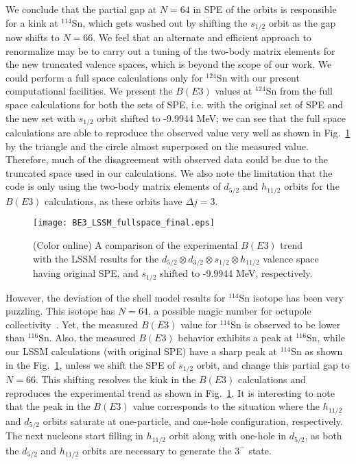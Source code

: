 \documentclass[twocolumn,showpacs,showkeys,preprintnumbers,amsmath,amssymb]{revtex4}
\begin{document}
We conclude that the partial gap at $N=64$ in SPE of the orbits is responsible for a kink at $^{114}$Sn, which gets washed out by shifting the $s_{1/2}$ orbit as the gap now shifts to $N=66$. We feel that an alternate and efficient approach to renormalize may be to carry out a tuning of the two-body matrix elements for the new truncated valence spaces, which is beyond the scope of our work. We could perform a full space calculations only for $^{124}$Sn with our present computational facilities. We present the $B(E3)$ values at $^{124}$Sn from the full space calculations for both the sets of SPE, i.e. with the original set of SPE and the new set with $s_{1/2}$ orbit shifted to -9.9944 MeV; we can see that the full space calculations are able to reproduce the observed value very well as shown in Fig.~\ref{fig:BE3_full} by the triangle and the circle almost superposed on the measured value. Therefore, much of the disagreement with observed data could be due to the truncated space used in our calculations. We also note the limitation that the code is only using the two-body matrix elements of $d_{5/2}$ and $h_{11/2}$ orbits for the $B(E3)$ calculations, as these orbits have $\Delta j=3$.

\begin{figure}
\texttt{[image: BE3\_LSSM\_fullspace\_final.eps]}
\caption{\label{fig:BE3_full}(Color online) A comparison of the experimental $B(E3)$ trend with the LSSM results for the $d_{5/2} \otimes d_{3/2} \otimes s_{1/2} \otimes h_{11/2}$ valence space having original SPE, and $s_{1/2}$ shifted to -9.9944 MeV, respectively.} 
\end{figure}  

However, the deviation of the shell model results for $^{114}$Sn isotope has been very puzzling. This isotope has $N=64$, a possible magic number for octupole collectivity~\cite{nazarewicz, cottle}. Yet, the measured $B(E3)$ value for $^{114}$Sn is observed to be lower than $^{116}$Sn. Also, the measured $B(E3)$ behavior exhibits a peak at $^{116}$Sn, while our LSSM calculations (with original SPE) have a sharp peak at $^{114}$Sn as shown in the Fig.~\ref{fig:BE3_full}, unless we shift the SPE of $s_{1/2}$ orbit, and change this partial gap to $N=66$. This shifting resolves the kink in the $B(E3)$ calculations and reproduces the experimental trend as shown in Fig.~\ref{fig:BE3_full}. It is interesting to note that the peak in the $B(E3)$ value corresponds to the situation where the $h_{11/2}$ and $d_{5/2}$ orbits saturate at one-particle, and one-hole configuration, respectively. The next nucleons start filling in $h_{11/2}$ orbit along with one-hole in $d_{5/2}$, as both the $d_{5/2}$ and $h_{11/2}$ orbits are necessary to generate the $3^-$ state.
\end{document}
